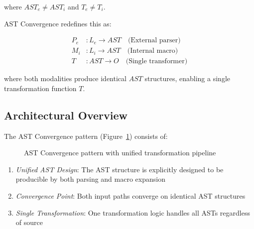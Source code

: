 \documentclass[conference]{IEEEtran}
\begin{document}
where $AST_e \neq AST_i$ and $T_e \neq T_i$.

AST Convergence redefines this as:

\begin{align*}
P_e &: L_e \rightarrow AST \quad \text{(External parser)}\\
M_i &: L_i \rightarrow AST \quad \text{(Internal macro)}\\
T &: AST \rightarrow O \quad \text{(Single transformer)}
\end{align*}

where both modalities produce identical $AST$ structures, enabling a single transformation function $T$.

\subsection{Architectural Overview}

The AST Convergence pattern (Figure~\ref{fig:convergence}) consists of:

\begin{figure}[htbp]
\centering
{}
\caption{AST Convergence pattern with unified transformation pipeline}
\label{fig:convergence}
\end{figure}

\begin{enumerate}
\item \emph{Unified AST Design}: The AST structure is explicitly designed to be producible by both parsing and macro expansion
\item \emph{Convergence Point}: Both input paths converge on identical AST structures
\item \emph{Single Transformation}: One transformation logic handles all ASTs regardless of source
\end{enumerate}
\end{document}
